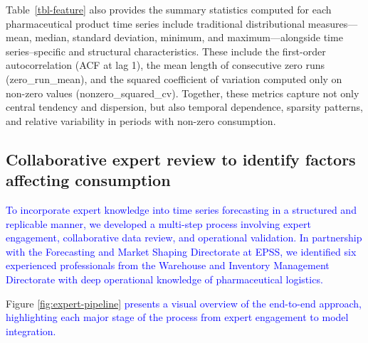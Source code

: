 \documentclass[
  authoryear,
  preprint,
  3p]{elsarticle}
\begin{document}
Table~\ref{tbl-feature} also provides the summary statistics computed
for each pharmaceutical product time series include traditional
distributional measures---mean, median, standard deviation, minimum, and
maximum---alongside time series--specific and structural
characteristics. These include the first-order autocorrelation (ACF at
lag 1), the mean length of consecutive zero runs (zero\_run\_mean), and
the squared coefficient of variation computed only on non-zero values
(nonzero\_squared\_cv). Together, these metrics capture not only central
tendency and dispersion, but also temporal dependence, sparsity
patterns, and relative variability in periods with non-zero consumption.

\subsection{Collaborative expert review to identify factors affecting
consumption}\label{collaborative-expert-review-to-identify-factors-affecting-consumption}

\textcolor{blue}{To incorporate expert knowledge into time series forecasting in a structured and replicable manner, we developed a multi-step process involving expert engagement, collaborative data review, and operational validation. In partnership with the Forecasting and Market Shaping Directorate at EPSS, we identified six experienced professionals from the Warehouse and Inventory Management Directorate with deep operational knowledge of pharmaceutical logistics.}

Figure \ref{fig:expert-pipeline}
\textcolor{blue}{presents a visual overview of the end-to-end approach, highlighting each major stage of the process from expert engagement to model integration.}
\end{document}
